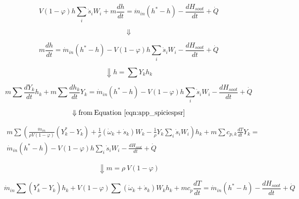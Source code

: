 \begin{equation*}
	V\left(1-\varphi\right)h\sum_{i}{{\dot{s}}_iW_i}+m\frac{dh}{dt}={\dot{m}}_{in}\left(h^\ast-h\right)-\frac{dH_{soot}}{dt}+\dot{Q}
\end{equation*}

\begin{equation*}
	\Downarrow
\end{equation*}

\begin{equation*}
	m\frac{dh}{dt}={\dot{m}}_{in}\left(h^\ast-h\right)-V\left(1-\varphi\right)h\sum_{i}{{\dot{s}}_iW_i}-\frac{dH_{soot}}{dt}+\dot{Q}
\end{equation*}

\begin{equation*}
	\Downarrow h=\sum{Y_kh_k}
\end{equation*}

\begin{equation*}
	m\sum{\frac{dY_k}{dt}h_k}+m\sum{\frac{dh_k}{dt}Y_k}={\dot{m}}_{in}\left(h^\ast-h\right)-V\left(1-\varphi\right)h\sum_{i}{{\dot{s}}_iW_i}-\frac{dH_{soot}}{dt}+\dot{Q}
\end{equation*}

\begin{equation*}
	\Downarrow \mathrm{from \: Equation~\ref{eqn:app_spiciespsr}}
\end{equation*}


\begin{equation*}
	\begin{split}
	m\sum{\left(\frac{{\dot{m}}_{in}}{\rho V\left(1-\varphi\right)}\left(Y_k^\ast-Y_k\right)
		+
	\frac{1}{\rho}\left({\dot{\omega}}_k
	+
	{\dot{s}}_k\right)W_k-\frac{1}{\rho}Y_k\sum_{i}{{\dot{s}}_iW_i}\right)h_k}
	+
	m\sum{c_{p,k}\frac{dT}{dt}Y_k}
	=\\
	{\dot{m}}_{in}\left(h^\ast-h\right)-V\left(1-\varphi\right)h\sum_{i}{{\dot{s}}_iW_i}-\frac{dH_{soot}}{dt}+\dot{Q}
	\end{split}
\end{equation*}

\begin{equation*}
	\Downarrow m=\rho\ V\left(1-\varphi\right)
\end{equation*}

\begin{equation*}
	{\dot{m}}_{in}\sum\left(Y_k^\ast-Y_k\right)h_k+V\left(1-\varphi\right)\sum{\left({\dot{\omega}}_k+{\dot{s}}_k\right)W_kh_k}+mc_p\frac{dT}{dt}={\dot{m}}_{in}\left(h^\ast-h\right)-\frac{dH_{soot}}{dt}+\dot{Q}
\end{equation*}

